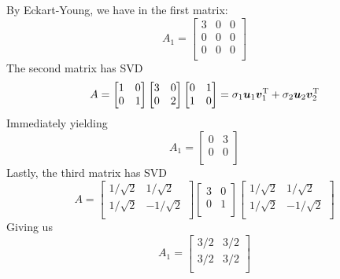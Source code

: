 \documentclass[a4paper]{article}
\begin{document}
By Eckart-Young, we have in the first matrix:
\[
	A_{1} =
	\begin{bmatrix}
		3 & 0 & 0 \\
		0 & 0 & 0 \\
		0 & 0 & 0 \\
	\end{bmatrix}
\]
The second matrix has SVD
\[
	A =
	\begin{bmatrix}
		1 & 0 \\
		0 & 1 \\
	\end{bmatrix}
	\begin{bmatrix}
		3 & 0 \\
		0 & 2 \\
	\end{bmatrix}
	\begin{bmatrix}
		0 & 1 \\
		1 & 0 \\
	\end{bmatrix}
	= \sigma_{1}\bm{u}_{1}\bm{v}_{1}^{\textsc{T}} + \sigma_{2}\bm{u}_{2}\bm{v}_{2}^{\textsc{T}}
\]
Immediately yielding
\[
	A_{1} = 
	\begin{bmatrix}
		0 & 3 \\
		0 & 0 \\
	\end{bmatrix}
\]
Lastly, the third matrix has SVD
\[
	A = 
	\begin{bmatrix}
		1/\sqrt{2} & 1/\sqrt{2} \\
		1/\sqrt{2} & -1/\sqrt{2} \\
	\end{bmatrix}
	\begin{bmatrix}
		3 & 0 \\
		0 & 1 \\
	\end{bmatrix}
	\begin{bmatrix}
		1/\sqrt{2} & 1/\sqrt{2} \\
		1/\sqrt{2} & -1/\sqrt{2} \\
	\end{bmatrix}
\]
Giving us
\[
	A_{1} = 
	\begin{bmatrix}
		3/2 & 3/2 \\
		3/2 & 3/2 \\
	\end{bmatrix}
\]

\end{document}
